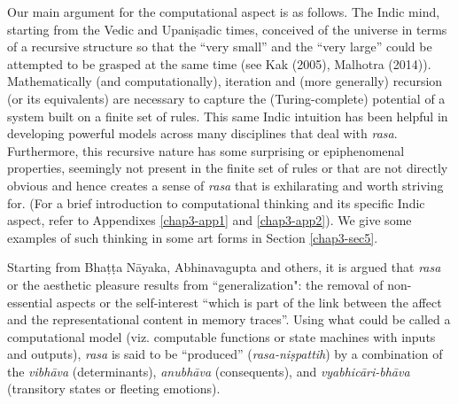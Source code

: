 Our main argument for the computational aspect is as follows. The Indic mind, starting from the Vedic and Upaniṣadic times, conceived of the universe in terms of a recursive structure so that the “very small” and the “very large” could be attempted to be grasped at the same time (see Kak (2005), Malhotra (2014)). Mathematically (and computationally), iteration and (more generally) recursion (or its equivalents) are necessary to capture the (Turing-complete) potential of a system built on a finite set of rules. This same Indic intuition has been helpful in developing powerful models across many disciplines that deal with \textsl{rasa}. Furthermore, this recursive nature has some surprising or epiphenomenal properties, seemingly not present in the finite set of rules or that are not directly obvious and hence creates a sense of \textsl{rasa} that is exhilarating and worth striving for. (For a brief introduction to computational thinking and its specific Indic aspect, refer to Appendixes \ref{chap3-app1} and \ref{chap3-app2}). We give some examples of such thinking in some art forms in Section \ref{chap3-sec5}.

Starting from Bhaṭṭa Nāyaka, Abhinavagupta and others, it is argued that \textsl{rasa} or the aesthetic pleasure results from ``generalization": the removal of non-essential aspects or the self-interest “which is part of the link between the affect and the representational content in memory traces”. Using what could be called a computational model (viz. computable functions or state machines with inputs and outputs), \textsl{rasa} is said to be “produced” (\textsl{rasa-niṣpattih}) by a combination of the \textsl{vibhāva} (determinants), \textsl{anubhāva} (consequents), and \textsl{vyabhicāri-bhāva} (transitory states or fleeting emotions). 

